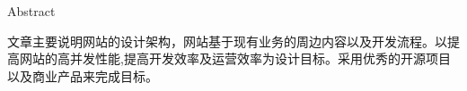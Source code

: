 {\Huge \hfill \hfill Abstract}
\vspace{8mm} %
\par 文章主要说明网站的设计架构，网站基于现有业务的周边内容以及开发流程。以提高网站的高并发性能,提高开发效率及运营效率为设计目标。采用优秀的开源项目以及商业产品来完成目标。